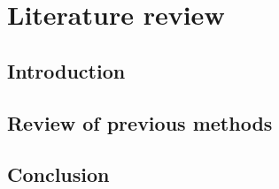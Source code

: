 \chapter{Literature review}
\label{chapter:literature_review} 


\section{Introduction}

\lipsum[2-4]

\section{Review of previous methods}

\lipsum[2-4]

\section{Conclusion}

\lipsum[2-4]
